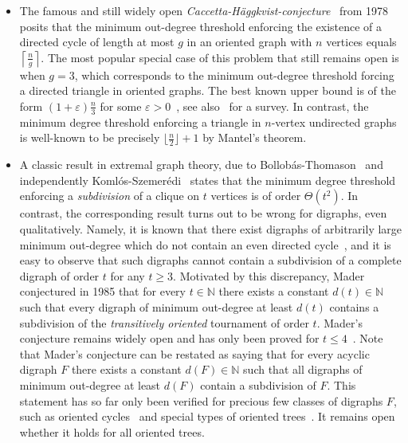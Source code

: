 \documentclass[a4paper,11pt]{article}
\theoremstyle{definition}
\begin{document}
\begin{itemize}
    \item The famous and still widely open \emph{Caccetta-H\"{a}ggkvist-conjecture}~\cite{Caccetta78} from 1978 posits that the minimum out-degree threshold enforcing the existence of a directed cycle of length at most $g$ in an oriented graph with $n$ vertices equals $\left\lceil\frac{n}{g}\right\rceil$. The most popular special case of this problem that still remains open is when $g=3$, which corresponds to the minimum out-degree threshold forcing a directed triangle in oriented graphs.  The best known upper bound is of the form $(1+\varepsilon)\frac{n}{3}$ for some $\varepsilon>0$~\cite{Hladky17}, see also~\cite{Sullivan06} for a survey. In contrast, the minimum degree threshold enforcing a triangle in $n$-vertex undirected graphs is well-known to be precisely $\lfloor \frac{n}{2}\rfloor+1$ by Mantel's theorem.
    \item A classic result in extremal graph theory, due to Bollob\'{a}s-Thomason~\cite{Bollobas98} and independently Koml\'{o}s-Szemer\'{e}di~\cite{Komlos94,Komlos96} states that the minimum degree threshold enforcing a \emph{subdivision} of a clique on $t$ vertices is of order $\Theta(t^2)$. In contrast, the corresponding result turns out to be wrong for digraphs, even qualitatively. Namely, it is known that there exist digraphs of arbitrarily large minimum out-degree which do not contain an even directed cycle~\cite{Thomassen85}, and it is easy to observe that such digraphs cannot contain a subdivision of a complete digraph of order $t$ for any $t\ge 3$. Motivated by this discrepancy, Mader~\cite{Mader85} conjectured in 1985 that for every $t\in \mathbb{N}$ there exists a constant $d(t)\in \mathbb{N}$ such that every digraph of minimum out-degree at least $d(t)$ contains a subdivision of the \emph{transitively oriented} tournament of order $t$. Mader's conjecture remains widely open and has only been proved for $t\le 4$~\cite{Mader96}. Note that Mader's conjecture can be restated as saying that for every acyclic digraph $F$ there exists a constant $d(F)\in \mathbb{N}$ such that all digraphs of minimum out-degree at least $d(F)$ contain a subdivision of $F$. This statement has so far only been verified for precious few classes of digraphs $F$, such as oriented cycles~\cite{Gishboliner22} and special types of oriented trees~\cite{Aboulker19}. It remains open whether it holds for all oriented trees.

\end{itemize}
\end{document}
